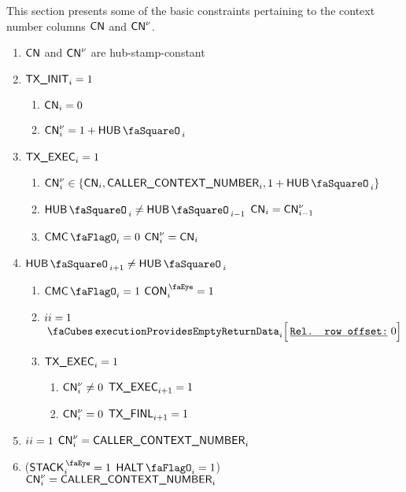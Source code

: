 This section presents some of the basic constraints pertaining to the context number columns $\textsf{CN}$ and $\textsf{CN}^{\nu}$.
\begin{enumerate}
	\item $\textsf{CN}$ and $\textsf{CN}^{\nu}$ are hub-stamp-constant
	\item \If $\textsf{TX}\textsf{\_INIT}_{i} = 1$ \Then
		\begin{enumerate}
			\item $\textsf{CN}     _{i} = 0$
			\item $\cn\new _{i} = 1 + \hubStamp_{i}$
		\end{enumerate}
	\item \If $\textsf{TX}\textsf{\_EXEC}_{i} = 1$ \Then 
		\begin{enumerate}
			\item\label{next context number}
				$\cn\new_{i} \in \{ \cn_{i}, \caller_{i}, 1 + \hubStamp_{i} \}$
			\item \If $\hubStamp_{i} \neq \hubStamp_{i - 1}$ \Then $\textsf{CN}_{i} = \textsf{CN}^{\nu}_{i - 1}$
			\item \If $\cmc_{i} = 0$ \Then $\textsf{CN}^{\nu}_{i} = \textsf{CN}_{i}$
		\end{enumerate}
	\item \If $\hubStamp_{i + 1} \neq \hubStamp_{i}$ \Then
		\begin{enumerate}
			\item \label{hub: generalities: context: whenever the context may change the final row is a context row}
				\If $\cmc_{i}    = 1$ \Then $\peekContext_{i} = 1$
			\item \label{hub: generalities: context: exceptions lead to providing empty return data}
				\If $\xAhoy_{i}  = 1$ \Then $\executionProvidesEmptyReturnData {i}{0} $
			\item \label{hub: generalities: context: how to trigger finalization phase} \If $\textsf{TX}\textsf{\_EXEC}_{i} = 1$
				\begin{enumerate}
				        \item \If $\textsf{CN}^{\nu}_{i} \neq 0$ \Then $\textsf{TX}\textsf{\_EXEC}_{i + 1} = 1$
				        \item \If $\textsf{CN}^{\nu}_{i} =    0$ \Then $\textsf{TX}\textsf{\_FINL}_{i + 1} = 1$
				\end{enumerate}
		\end{enumerate}
	\item \If $\xAhoy_{i} = 1$ \Then $\textsf{CN}^{\nu}_{i} = \textsf{CALLER\_CONTEXT\_NUMBER}_{i}$
	\item \If \big($\peekStack_{i} = 1$ \et $\haltFlag_{i} = 1$\big) \Then $\textsf{CN}^{\nu}_{i} = \textsf{CALLER\_CONTEXT\_NUMBER}_{i}$
\end{enumerate}
\saNote{} \label{hub: generalities: context: consequences of CMC and XAHOY}
